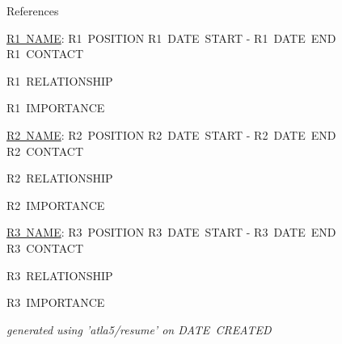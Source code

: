 \documentclass{resume} %
\begin{document}
  \begin{rSection}{References}

    \begin{rSubsection}{\underline{R1~NAME}: R1~POSITION }{ R1~DATE~START - R1~DATE~END }{R1~CONTACT}

      \item R1~RELATIONSHIP \newline

      \item R1~IMPORTANCE \newline

    \end{rSubsection}

    \begin{rSubsection}{\underline{R2~NAME}: R2~POSITION }{ R2~DATE~START - R2~DATE~END }{R2~CONTACT}

      \item R2~RELATIONSHIP \newline

      \item R2~IMPORTANCE \newline \newline

    \end{rSubsection}

    \begin{rSubsection}{\underline{R3~NAME}: R3~POSITION }{ R3~DATE~START - R3~DATE~END }{R3~CONTACT}

      \item R3~RELATIONSHIP \newline

      \item R3~IMPORTANCE \newline

    \end{rSubsection}

  \end{rSection}

  \begin{flushright}
    \em{generated using 'atla5/resume' on DATE~CREATED}
  \end{flushright}
\end{document}
